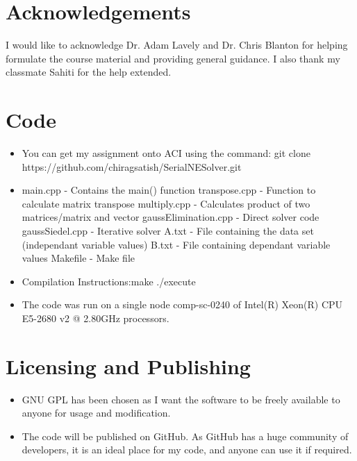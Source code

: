 \documentclass{article}
\begin{document}
\begin{spacing}{1.1}
\newpage
\begin{appendices}

\section{Acknowledgements}

I would like to acknowledge Dr. Adam Lavely and Dr. Chris Blanton for helping formulate the course material and providing general guidance. I also thank my classmate Sahiti for the help extended. 

\section{Code}

\begin{itemize}
    \item You can get my assignment onto ACI using the command: \newline git clone https://github.com/chiragsatish/SerialNESolver.git
    \item main.cpp - Contains the main() function \newline transpose.cpp - Function to calculate matrix transpose \newline multiply.cpp - Calculates product of two matrices/matrix and vector \newline gaussElimination.cpp - Direct solver code \newline gaussSiedel.cpp - Iterative solver \newline A.txt - File containing the data set (independant variable values) \newline B.txt - File containing dependant variable values \newline Makefile - Make file 
    \item Compilation Instructions:\newline make \newline ./execute
    \item The code was run on a single node comp-sc-0240 of Intel(R) Xeon(R) CPU E5-2680 v2 @ 2.80GHz processors. 
\end{itemize}

\section{Licensing and Publishing}

\begin{itemize}
    \item GNU GPL has been chosen as I want the software to be freely available to anyone for usage and modification.
    \item The code will be published on GitHub. As GitHub has a huge community of developers, it is an ideal place for my code, and anyone can use it if required.
\end{itemize}
\end{appendices}








\end{spacing}
\end{document}
